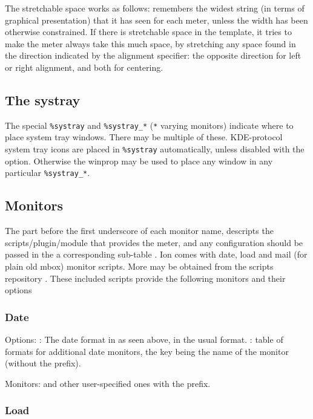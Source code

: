 The stretchable space works as follows:  remembers
the widest string (in terms of graphical presentation) that it has
seen for each meter, unless the width has been otherwise constrained.
If there is stretchable space in the template, it tries to make the
meter always take this much space, by stretching any space found in
the direction indicated by the alignment specifier: the opposite
direction for left or right alignment, and both for centering.

\subsection{The systray}

The special \verb!%systray! and \verb!%systray_*! (\verb!*! varying
monitors) indicate where to place system tray windows. 
There may be multiple of these. KDE-protocol system tray
icons are placed in \verb!%systray! automatically, unless disabled with
the  option. Otherwise the  winprop may
be used to place any window in any particular \verb!%systray_*!.

\subsection{Monitors}

The part before the first
underscore of each monitor name, descripts the scripts/plugin/module
that provides the meter, and any configuration should be passed
in the a corresponding sub-table .
Ion comes with date, load and mail (for plain old mbox) 
 monitor scripts. More may be obtained from 
the scripts repository \cite{scripts}. These included scripts 
provide the following monitors and their options

\subsubsection{Date}

Options: : The date format in as seen above, 
in the usual  format. : table of
formats for additional date monitors, the key being the name
of the monitor (without the  prefix).

Monitors:  and other user-specified ones with the
 prefix.


\subsubsection{Load}

